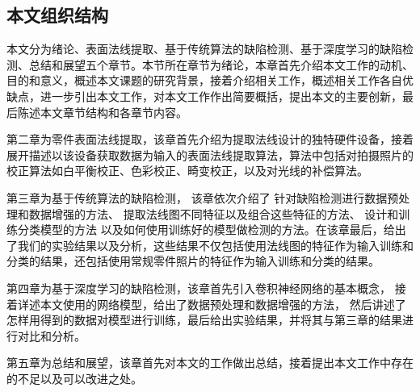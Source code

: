 \subsection{本文组织结构}

本文分为绪论、表面法线提取、基于传统算法的缺陷检测、基于深度学习的缺陷检测、总结和展望五个章节。本节所在章节为绪论，本章首先介绍本文工作的动机、目的和意义，概述本文课题的研究背景，接着介绍相关工作，概述相关工作各自优缺点，进一步引出本文工作，对本文工作作出简要概括，提出本文的主要创新，最后陈述本文章节结构和各章节内容。

第二章为零件表面法线提取，该章首先介绍为提取法线设计的独特硬件设备，接着展开描述以该设备获取数据为输入的表面法线提取算法，算法中包括对拍摄照片的校正算法如白平衡校正、色彩校正、畸变校正，以及对光线的补偿算法。

第三章为基于传统算法的缺陷检测，
该章依次介绍了
针对缺陷检测进行数据预处理和数据增强的方法、
提取法线图不同特征以及组合这些特征的方法、
设计和训练分类模型的方法
以及如何使用训练好的模型做检测的方法。在该章最后，给出了我们的实验结果以及分析，这些结果不仅包括使用法线图的特征作为输入训练和分类的结果，还包括使用常规零件照片的特征作为输入训练和分类的结果。

第四章为基于深度学习的缺陷检测，该章首先引入卷积神经网络的基本概念，
接着详述本文使用的网络模型，给出了数据预处理和数据增强的方法，
然后讲述了怎样用得到的数据对模型进行训练，最后给出实验结果，并将其与第三章的结果进行对比和分析。

第五章为总结和展望，该章首先对本文的工作做出总结，接着提出本文工作中存在的不足以及可以改进之处。
